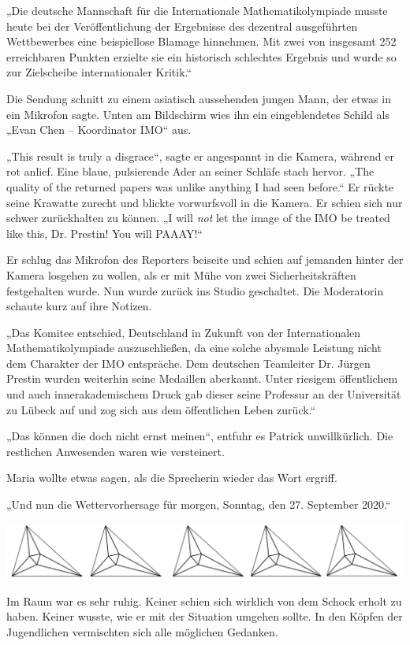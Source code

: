 \documentclass[oneside]{memoir}
\newcommand{\parasep}{
\bigskip
\bigskip
\begin{center} 
   \includegraphics[scale=.08]{parasep5.jpg} 
\end{center}
\bigskip
\bigskip
}
\begin{document}
„Die deutsche Mannschaft für die Internationale Mathematikolympiade musste heute bei der Veröffentlichung der Ergebnisse des dezentral ausgeführten Wettbewerbes eine beispiellose Blamage hinnehmen. Mit zwei von insgesamt 252 erreichbaren Punkten erzielte sie ein historisch schlechtes Ergebnis und wurde so zur Zielscheibe internationaler Kritik.“

Die Sendung schnitt zu einem asiatisch aussehenden jungen Mann, der etwas in ein Mikrofon sagte. Unten am Bildschirm wies ihn ein eingeblendetes Schild als „Evan Chen – Koordinator IMO“ aus.

„This result is truly a disgrace“, sagte er angespannt in die Kamera, während er rot anlief. Eine blaue, pulsierende Ader an seiner Schläfe stach hervor. „The quality of the returned papers was unlike anything I had seen before.“ Er rückte seine Krawatte zurecht und blickte vorwurfsvoll in die Kamera. Er schien sich nur schwer zurückhalten zu können. „I will \textit{not} let the image of the IMO be treated like this, Dr. Prestin! You will PAAAY!“

Er schlug das Mikrofon des Reporters beiseite und schien auf jemanden hinter der Kamera losgehen zu wollen, als er mit Mühe von zwei Sicherheitskräften festgehalten wurde. Nun wurde zurück ins Studio geschaltet. Die Moderatorin schaute kurz auf ihre Notizen.

„Das Komitee entschied, Deutschland in Zukunft von der Internationalen Mathematikolympiade auszuschließen, da eine solche abysmale Leistung nicht dem Charakter der IMO entspräche. Dem deutschen Teamleiter Dr. Jürgen Prestin wurden weiterhin seine Medaillen aberkannt. Unter riesigem öffentlichem und auch innerakademischem Druck gab dieser seine Professur an der Universität zu Lübeck auf und zog sich aus dem öffentlichen Leben zurück.“

„Das können die doch nicht ernst meinen“, entfuhr es Patrick unwillkürlich. Die restlichen Anwesenden waren wie versteinert.

Maria wollte etwas sagen, als die Sprecherin wieder das Wort ergriff.

„Und nun die Wettervorhersage für morgen, Sonntag, den 27. September 2020.“

     
     \parasep
     
Im Raum war es sehr ruhig. Keiner schien sich wirklich von dem Schock erholt zu haben. Keiner wusste, wie er mit der Situation umgehen sollte.
In den Köpfen der Jugendlichen vermischten sich alle möglichen Gedanken.
\end{document}
